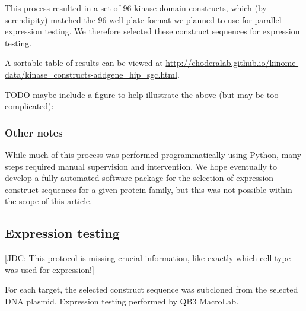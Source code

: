 \documentclass[aps,pre,twocolumn,nofootinbib,superscriptaddress,linenumbers]{revtex4-1}
\begin{document}
This process resulted in a set of 96 kinase domain constructs, which (by serendipity) matched the 96-well plate format we planned to use for parallel expression testing.
We therefore selected these construct sequences for expression testing.

A sortable table of results can be viewed at \url{http://choderalab.github.io/kinome-data/kinase\_constructs-addgene\_hip\_sgc.html}.

{
\color{blue}
TODO maybe include a figure to help illustrate the above (but may be too complicated):
}

\subsubsection{Other notes}

While much of this process was performed programmatically using Python, many steps required manual supervision and intervention.
We hope eventually to develop a fully automated software package for the selection of expression construct sequences for a given protein family, but this was not possible within the scope of this article.

\subsection{Expression testing}

{\color{red}[JDC: This protocol is missing crucial information, like exactly which cell type was used for expression!]}

For each target, the selected construct sequence was subcloned from the selected DNA plasmid.
Expression testing performed by QB3 MacroLab.
\end{document}
